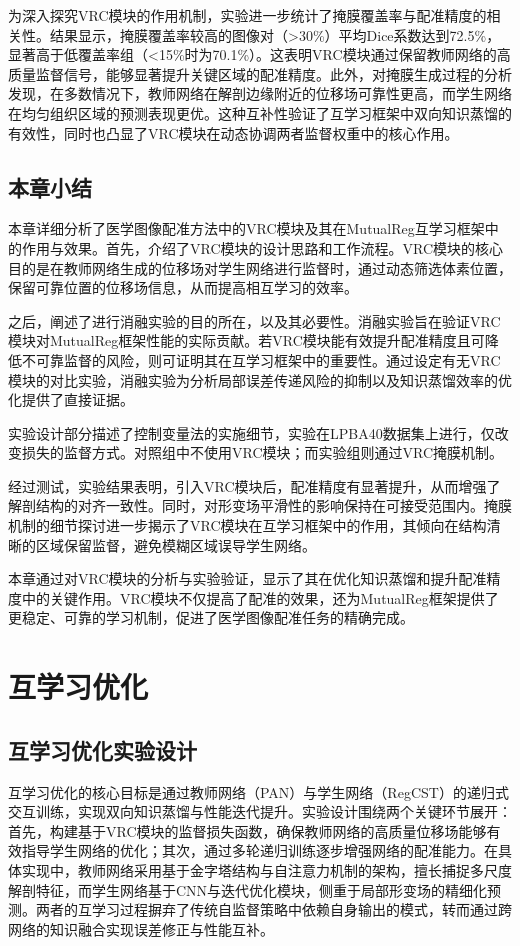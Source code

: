 为深入探究VRC模块的作用机制，实验进一步统计了掩膜覆盖率与配准精度的相关性。结果显示，掩膜覆盖率较高的图像对（>30\%）平均Dice系数达到72.5\%，显著高于低覆盖率组（<15\%时为70.1\%）。这表明VRC模块通过保留教师网络的高质量监督信号，能够显著提升关键区域的配准精度。此外，对掩膜生成过程的分析发现，在多数情况下，教师网络在解剖边缘附近的位移场可靠性更高，而学生网络在均匀组织区域的预测表现更优。这种互补性验证了互学习框架中双向知识蒸馏的有效性，同时也凸显了VRC模块在动态协调两者监督权重中的核心作用。

\section{本章小结}

本章详细分析了医学图像配准方法中的VRC模块及其在MutualReg互学习框架中的作用与效果。首先，介绍了VRC模块的设计思路和工作流程。VRC模块的核心目的是在教师网络生成的位移场对学生网络进行监督时，通过动态筛选体素位置，保留可靠位置的位移场信息，从而提高相互学习的效率。

之后，阐述了进行消融实验的目的所在，以及其必要性。消融实验旨在验证VRC模块对MutualReg框架性能的实际贡献。若VRC模块能有效提升配准精度且可降低不可靠监督的风险，则可证明其在互学习框架中的重要性。通过设定有无VRC模块的对比实验，消融实验为分析局部误差传递风险的抑制以及知识蒸馏效率的优化提供了直接证据。

实验设计部分描述了控制变量法的实施细节，实验在LPBA40数据集上进行，仅改变损失的监督方式。对照组中不使用VRC模块；而实验组则通过VRC掩膜机制。

经过测试，实验结果表明，引入VRC模块后，配准精度有显著提升，从而增强了解剖结构的对齐一致性。同时，对形变场平滑性的影响保持在可接受范围内。掩膜机制的细节探讨进一步揭示了VRC模块在互学习框架中的作用，其倾向在结构清晰的区域保留监督，避免模糊区域误导学生网络。

本章通过对VRC模块的分析与实验验证，显示了其在优化知识蒸馏和提升配准精度中的关键作用。VRC模块不仅提高了配准的效果，还为MutualReg框架提供了更稳定、可靠的学习机制，促进了医学图像配准任务的精确完成。

\chapter{互学习优化}

\section{互学习优化实验设计}

互学习优化的核心目标是通过教师网络（PAN）与学生网络（RegCST）的递归式交互训练，实现双向知识蒸馏与性能迭代提升。实验设计围绕两个关键环节展开：首先，构建基于VRC模块的监督损失函数，确保教师网络的高质量位移场能够有效指导学生网络的优化；其次，通过多轮递归训练逐步增强网络的配准能力。在具体实现中，教师网络采用基于金字塔结构与自注意力机制的架构，擅长捕捉多尺度解剖特征，而学生网络基于CNN与迭代优化模块，侧重于局部形变场的精细化预测。两者的互学习过程摒弃了传统自监督策略中依赖自身输出的模式，转而通过跨网络的知识融合实现误差修正与性能互补。

